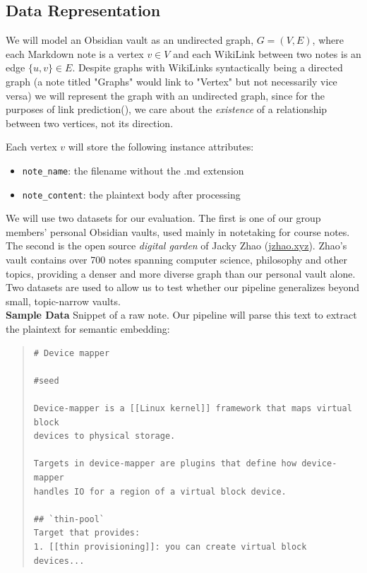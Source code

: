 \documentclass[fontsize=11pt]{article}
\begin{document}
\subsection*{Data Representation}
We will model an Obsidian vault as an undirected graph, $G = (V, E)$, where each Markdown note is a vertex $v \in V$ and each WikiLink between two notes is an edge $\{u, v\} \in E$. Despite graphs with WikiLinks syntactically being a directed graph (a note titled "Graphs" would link to "Vertex" but not necessarily vice versa) we will represent the graph with an undirected graph, since for the purposes of link prediction(\cite {gfg_linkprediction}), we care about the \textit{existence} of a relationship between two vertices, not its direction.

\noindent Each vertex $v$ will store the following instance attributes:
\begin{itemize}
    \item \texttt{note\_name}: the filename without the .md extension
    \item \texttt{note\_content}: the plaintext body after processing
\end{itemize}


\noindent We will use two datasets for our evaluation. The first is one of our group members' personal Obsidian vaults, used mainly in notetaking for course notes. The second is the open source \textit{digital garden} of Jacky Zhao (\url{jzhao.xyz}). Zhao's vault contains over 700 notes spanning computer science, philosophy and other topics, providing a denser and more diverse graph than our personal vault alone. Two datasets are used to allow us to test whether our pipeline generalizes beyond small, topic-narrow vaults.\\

\noindent \textbf{Sample Data} Snippet of a raw note. Our pipeline will parse this text to extract the plaintext for semantic embedding:
\begin{quote}
\begin{verbatim}
# Device mapper

#seed

Device-mapper is a [[Linux kernel]] framework that maps virtual block 
devices to physical storage.

Targets in device-mapper are plugins that define how device-mapper 
handles IO for a region of a virtual block device.

## `thin-pool`
Target that provides:
1. [[thin provisioning]]: you can create virtual block devices...
\end{verbatim}
\end{quote}
\end{document}
